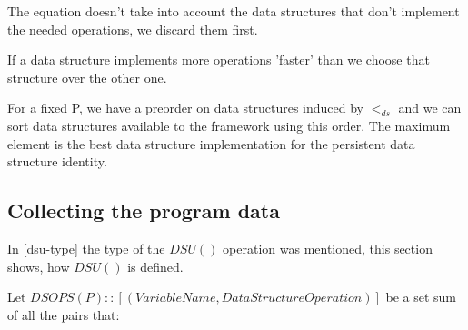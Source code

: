 \documentclass[a4paper,11pt]{article}
\begin{document}
		The equation doesn't take into account the data structures that don't implement the needed operations,
		we discard them first.

		If a data structure implements more operations 'faster' than we choose that structure over
		the other one.

		For a fixed P, we have a preorder on data structures induced by $<_{ds}$ and we can sort data structures
		available to the framework using this order. The maximum element is the best data structure
		implementation for the persistent data structure identity.

	\subsection{Collecting the program data} \label{dsu-definition}

		In \autoref{dsu-type} the type of the $DSU()$ operation was mentioned, this section shows, how $DSU()$ is
		defined.

		Let $DSOPS(P) :: [(VariableName, DataStructureOperation)]$ be a set sum of all the pairs that:
\end{document}
